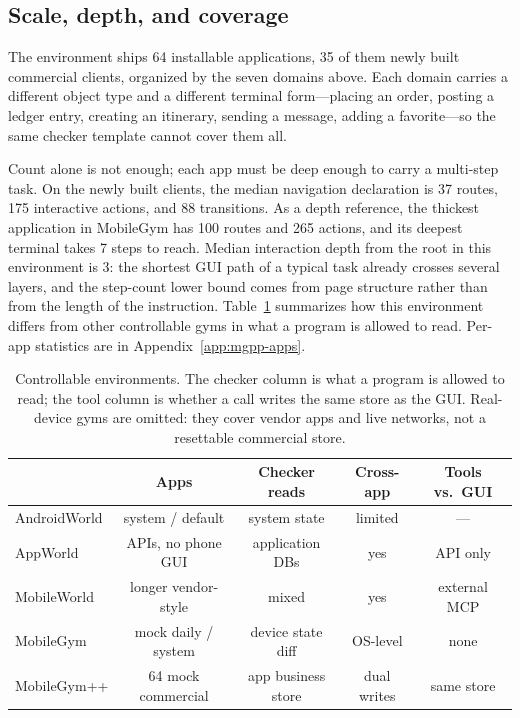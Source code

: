 \subsection{Scale, depth, and coverage}
\label{sec:mgpp-scale}

The environment ships 64 installable applications, 35 of them newly built commercial clients, organized by the seven domains above. Each domain carries a different object type and a different terminal form---placing an order, posting a ledger entry, creating an itinerary, sending a message, adding a favorite---so the same checker template cannot cover them all.

Count alone is not enough; each app must be deep enough to carry a multi-step task. On the newly built clients, the median navigation declaration is 37 routes, 175 interactive actions, and 88 transitions. As a depth reference, the thickest application in MobileGym has 100 routes and 265 actions, and its deepest terminal takes 7 steps to reach. Median interaction depth from the root in this environment is 3: the shortest GUI path of a typical task already crosses several layers, and the step-count lower bound comes from page structure rather than from the length of the instruction. Table~\ref{tab:mgpp-compare} summarizes how this environment differs from other controllable gyms in what a program is allowed to read. Per-app statistics are in Appendix~\ref{app:mgpp-apps}.

\begin{table}[t]
\caption{Controllable environments. The checker column is what a program is allowed to read; the tool column is whether a call writes the same store as the GUI. Real-device gyms are omitted: they cover vendor apps and live networks, not a resettable commercial store.}
\label{tab:mgpp-compare}
\begin{center}
\scriptsize
\setlength{\tabcolsep}{3pt}
\begin{tabular}{lcccc}
\hline
 & Apps & Checker reads & Cross-app & Tools vs.\ GUI \\
\hline
AndroidWorld & system / default & system state & limited & --- \\
AppWorld & APIs, no phone GUI & application DBs & yes & API only \\
MobileWorld & longer vendor-style & mixed & yes & external MCP \\
MobileGym & mock daily / system & device state diff & OS-level & none \\
MobileGym++ & 64 mock commercial & app business store & dual writes & same store \\
\hline
\end{tabular}
\end{center}
\end{table}

